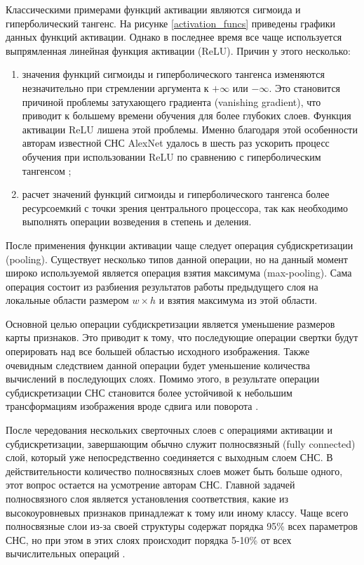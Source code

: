 Классическими примерами функций активации являются сигмоида и гиперболический тангенс. На рисунке \ref{activation_funcs}
приведены графики данных функций активации. Однако в последнее время все чаще используется выпрямленная линейная 
функция активации (ReLU). Причин у этого несколько:


\begin{enumerate}
\item значения функций сигмоиды и гиперболического тангенса изменяются незначительно при стремлении аргумента к 
$+\infty$ или $-\infty$. Это становится причиной проблемы затухающего градиента (vanishing gradient), что приводит к 
большему времени обучения для более глубоких слоев. Функция активации ReLU лишена этой проблемы. Именно благодаря этой 
особенности авторам известной СНС AlexNet удалось в шесть раз ускорить процесс обучения при использовании ReLU по сравнению 
с гиперболическим тангенсом \cite{ALEXNET};
\item расчет значений функций сигмоиды и гиперболического тангенса более ресурсоемкий с точки зрения центрального процессора,
так как необходимо выполнять операции возведения в степень и деления.
\end{enumerate}

После применения функции активации чаще следует операция субдискретизации (pooling). Существует несколько типов 
данной операции, но на данный момент широко используемой является операция взятия максимума (max-pooling). Сама операция
состоит из разбиения результатов работы предыдущего слоя на локальные области размером $w \times h$ и взятия максимума 
из этой области.

Основной целью операции субдискретизации является уменьшение размеров карты признаков. Это приводит к тому, что последующие
операции свертки будут оперировать над все большей областью исходного изображения. Также очевидным следствием данной 
операции будет уменьшение количества вычислений в последующих слоях. Помимо этого, в результате операции субдискретизации
СНС становится более устойчивой к небольшим трансформациям изображения вроде сдвига или поворота \cite{DIVE_INTO_DL}.

После чередования нескольких сверточных слоев с операциями активации и субдискретизации, завершающим обычно служит
полносвязный (fully connected) слой, который уже непосредственно соединяется с выходным слоем СНС. В действительности количество
полносвязных слоев может быть больше одного, этот вопрос остается на усмотрение авторам СНС. Главной задачей полносвязного
слоя является установления соответствия, какие из высокоуровневых признаков принадлежат к тому или иному классу. Чаще всего 
полносвязные слои из-за своей структуры содержат порядка 95\% всех параметров СНС, но при этом в этих слоях происходит 
порядка 5-10\% от всех вычислительных операций \cite{PARALLEL_CNN}.

